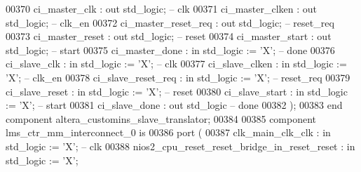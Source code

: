 \begin{DoxyCode}
00370             ci\_master\_clk       : \textcolor{keywordflow}{out} \textcolor{comment}{std\_logic};                                        \textcolor{keyword}{-- clk}
00371             ci\_master\_clken     : \textcolor{keywordflow}{out} \textcolor{comment}{std\_logic};                                        \textcolor{keyword}{-- clk\_en}
00372             ci\_master\_reset\_req : \textcolor{keywordflow}{out} \textcolor{comment}{std\_logic};                                        \textcolor{keyword}{-- reset\_req}
00373             ci\_master\_reset     : \textcolor{keywordflow}{out} \textcolor{comment}{std\_logic};                                        \textcolor{keyword}{-- reset}
00374             ci\_master\_start     : \textcolor{keywordflow}{out} \textcolor{comment}{std\_logic};                                        \textcolor{keyword}{-- start}
00375             ci\_master\_done      : \textcolor{keywordflow}{in}  \textcolor{comment}{std\_logic}                     := 'X';             \textcolor{keyword}{-- done}
00376             ci\_slave\_clk        : \textcolor{keywordflow}{in}  \textcolor{comment}{std\_logic}                     := 'X';             \textcolor{keyword}{-- clk}
00377             ci\_slave\_clken      : \textcolor{keywordflow}{in}  \textcolor{comment}{std\_logic}                     := 'X';             \textcolor{keyword}{-- clk\_en}
00378             ci\_slave\_reset\_req  : \textcolor{keywordflow}{in}  \textcolor{comment}{std\_logic}                     := 'X';             \textcolor{keyword}{-- reset\_req}
00379             ci\_slave\_reset      : \textcolor{keywordflow}{in}  \textcolor{comment}{std\_logic}                     := 'X';             \textcolor{keyword}{-- reset}
00380             ci\_slave\_start      : \textcolor{keywordflow}{in}  \textcolor{comment}{std\_logic}                     := 'X';             \textcolor{keyword}{-- start}
00381             ci\_slave\_done       : \textcolor{keywordflow}{out} \textcolor{comment}{std\_logic}\textcolor{keyword}{                                         -- done}
00382         );
00383     \textcolor{keywordflow}{end} \textcolor{keywordflow}{component} \textcolor{vhdlchar}{altera_customins_slave_translator};
00384 
00385     \textcolor{keywordflow}{component} lms\_ctr\_mm\_interconnect\_0 \textcolor{keywordflow}{is}
00386         \textcolor{keywordflow}{port} (
00387             clk\_main\_clk\_clk                            : \textcolor{keywordflow}{in}  \textcolor{comment}{std\_logic}                     := 'X';        
           \textcolor{keyword}{-- clk}
00388             nios2\_cpu\_reset\_reset\_bridge\_in\_reset\_reset : \textcolor{keywordflow}{in}  \textcolor{comment}{std\_logic}                     := 'X';        

\end{DoxyCode}
